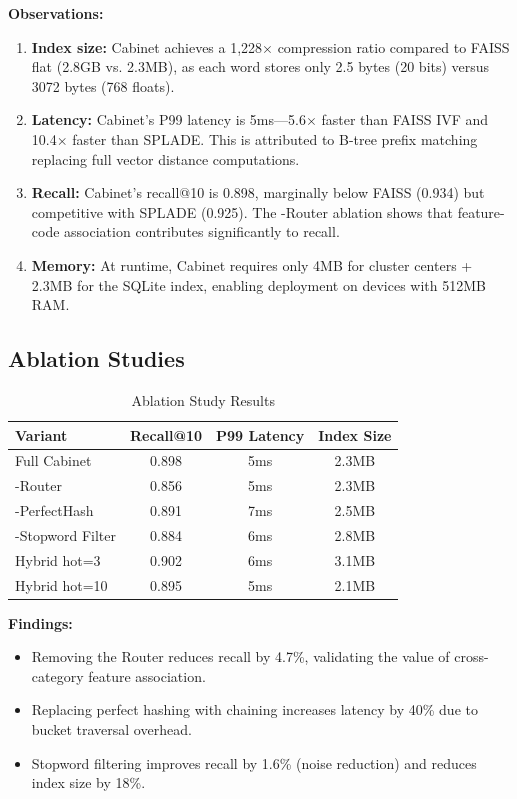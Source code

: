 \documentclass[11pt,a4paper]{article}
\theoremstyle{definition}
\begin{document}
\textbf{Observations:}
\begin{enumerate}
    \item \textbf{Index size:} Cabinet achieves a 1,228$\times$ compression ratio compared to FAISS flat (2.8GB vs. 2.3MB), as each word stores only 2.5 bytes (20 bits) versus 3072 bytes (768 floats).
    \item \textbf{Latency:} Cabinet's P99 latency is 5ms---5.6$\times$ faster than FAISS IVF and 10.4$\times$ faster than SPLADE. This is attributed to B-tree prefix matching replacing full vector distance computations.
    \item \textbf{Recall:} Cabinet's recall@10 is 0.898, marginally below FAISS (0.934) but competitive with SPLADE (0.925). The -Router ablation shows that feature-code association contributes significantly to recall.
    \item \textbf{Memory:} At runtime, Cabinet requires only 4MB for cluster centers + 2.3MB for the SQLite index, enabling deployment on devices with 512MB RAM.
\end{enumerate}

\subsection{Ablation Studies}

\begin{table}[H]
\centering
\caption{Ablation Study Results}
\label{tab:ablation}
\begin{tabular}{lccc}
\toprule
\textbf{Variant} & \textbf{Recall@10} & \textbf{P99 Latency} & \textbf{Index Size} \\
\midrule
Full Cabinet & 0.898 & 5ms & 2.3MB \\
-Router & 0.856 & 5ms & 2.3MB \\
-PerfectHash & 0.891 & 7ms & 2.5MB \\
-Stopword Filter & 0.884 & 6ms & 2.8MB \\
Hybrid hot=3 & 0.902 & 6ms & 3.1MB \\
Hybrid hot=10 & 0.895 & 5ms & 2.1MB \\
\bottomrule
\end{tabular}
\end{table}

\textbf{Findings:}
\begin{itemize}
    \item Removing the Router reduces recall by 4.7\%, validating the value of cross-category feature association.
    \item Replacing perfect hashing with chaining increases latency by 40\% due to bucket traversal overhead.
    \item Stopword filtering improves recall by 1.6\% (noise reduction) and reduces index size by 18\%.
\end{itemize}
\end{document}
